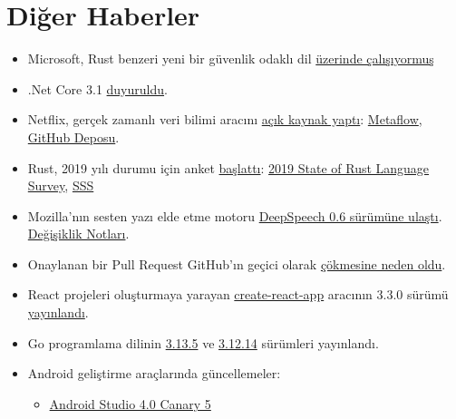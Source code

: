 \documentclass[11pt]{article}
\begin{document}
\section{Diğer Haberler}
\label{sec:org7466864}
\begin{itemize}
\item Microsoft, Rust benzeri yeni bir güvenlik odaklı dil \href{https://www.zdnet.com/article/microsoft-were-creating-a-new-rust-based-programming-language-for-secure-coding/}{üzerinde çalışıyormuş}
\item .Net Core 3.1 \href{https://devblogs.microsoft.com/dotnet/announcing-net-core-3-1/}{duyuruldu}.
\item Netflix, gerçek zamanlı veri bilimi aracını \href{https://medium.com/netflix-techblog/open-sourcing-metaflow-a-human-centric-framework-for-data-science-fa72e04a5d9}{açık kaynak yaptı}: \href{https://metaflow.org/}{Metaflow},
\href{https://github.com/Netflix/metaflow}{GitHub Deposu}.
\item Rust, 2019 yılı durumu için anket \href{https://blog.rust-lang.org/2019/12/03/survey-launch.html}{başlattı}: \href{https://docs.google.com/forms/d/e/1FAIpQLSdu9oHszoG4CAq1X1FkJIp70bXSbMNKIP0n4Serr\_gTszl01Q/viewform}{2019 State of Rust Language
Survey}, \href{https://github.com/rust-community/team/wiki/State-of-the-Rust-Language-Community-Survey-FAQ}{SSS}
\item Mozilla'nın sesten yazı elde etme motoru \href{https://hacks.mozilla.org/2019/12/deepspeech-0-6-mozillas-speech-to-text-engine/}{DeepSpeech 0.6 sürümüne ulaştı}.
\href{https://github.com/mozilla/DeepSpeech/releases/tag/v0.6.0}{Değişiklik Notları}.
\item Onaylanan bir Pull Request GitHub'ın geçici olarak \href{https://github.com/ianstormtaylor/slate/pull/3093\#issuecomment-559313932}{çökmesine neden oldu}.
\item React projeleri oluşturmaya yarayan \href{https://github.com/facebook/create-react-app}{create-react-app} aracının 3.3.0 sürümü
\href{https://github.com/facebook/create-react-app/releases/tag/v3.3.0}{yayınlandı}.
\item Go programlama dilinin \href{https://golang.org/doc/devel/release.html\#go1.13.minor}{3.13.5} ve \href{https://golang.org/doc/devel/release.html\#go1.12.minor}{3.12.14} sürümleri yayınlandı.
\item Android geliştirme araçlarında güncellemeler:
\begin{itemize}
\item \href{https://androidstudio.googleblog.com/2019/12/android-studio-40-canary-5-available.html}{Android Studio 4.0 Canary 5}

\end{itemize}
\end{itemize}
\end{document}
